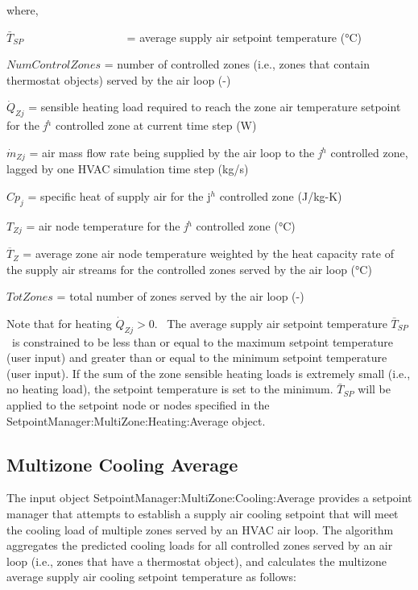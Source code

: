 where,

\({\bar T_{SP}}\) ~~~~~~~~~~~~~~~~~ = average supply air setpoint temperature (°C)

\(NumControlZones\) = number of controlled zones (i.e., zones that contain thermostat objects) served by the air loop (-)

\({\dot Q_{Zj}}\) = sensible heating load required to reach the zone air temperature setpoint for the \emph{j}\(^{h}\) controlled zone at current time step (W)

\({\dot m_{Zj}}\) = air mass flow rate being supplied by the air loop to the \emph{j}\(^{h}\) controlled zone, lagged by one HVAC simulation time step (kg/s)

\(C{p_j}\) = specific heat of supply air for the j\(^{h}\) controlled zone (J/kg-K)

\({T_{Zj}}\) = air node temperature for the \emph{j}\(^{h}\) controlled zone (°C)

\({\overline T_Z}\) = average zone air node temperature weighted by the heat capacity rate of the supply air streams for the controlled zones served by the air loop (°C)

\(TotZones\) = total number of zones served by the air loop (-)

Note that for heating \({\dot Q_{Zj}} > 0.\) ~The average supply air setpoint temperature \({\bar T_{SP}}\) ~is constrained to be less than or equal to the maximum setpoint temperature (user input) and greater than or equal to the minimum setpoint temperature (user input). If the sum of the zone sensible heating loads is extremely small (i.e., no heating load), the setpoint temperature is set to the minimum. \({\bar T_{SP}}\) will be applied to the setpoint node or nodes specified in the SetpointManager:MultiZone:Heating:Average object.

\subsection{Multizone Cooling Average}\label{multizone-cooling-average}

The input object SetpointManager:MultiZone:Cooling:Average provides a setpoint manager that attempts to establish a supply air cooling setpoint that will meet the cooling load of multiple zones served by an HVAC air loop. The algorithm aggregates the predicted cooling loads for all controlled zones served by an air loop (i.e., zones that have a thermostat object), and calculates the multizone average supply air cooling setpoint temperature as follows:

